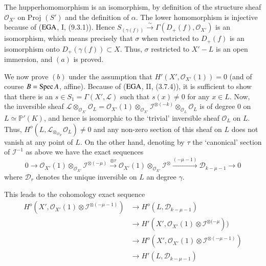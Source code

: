 The hupper\pageoriginale  homomorphism is an isomorphism, by
definition of the 
structure sheaf $\mathscr{O}_{X'}$ on Proj $(S')$ and the definition
of $\alpha$. The lower homomorphism is injective because of ($\operatorname{EGA}$,
I, (9.3.1)). Hence
$S_{(\gamma(f))}\overset{\sim}{\rightarrow}\Gamma(D_+(f),\mathscr{O}_{X'})$
is an isomorphism, which means precisely that $\sigma$ when restricted
to $D_+(f)$ is an isomorphism onto $D_+(\gamma(f))\subset X$. Thus,
$\sigma$ restricted to $X' - L$ is an open immersion, and $(a)$ is
proved. 

We now prove $(b)$ under the assumption that
$H'(X',\mathscr{O}_{X'}(1)) = 0$ (and of course $B = \operatorname{Spec} A$,
affine). Because of ($\operatorname{EGA}$, II, (3.7.4)), it is sufficient to show
that there is an $s \in S_1 = \Gamma(X',\mathscr{L})$ such that $s(x)
\neq 0 $ for any $x \in L$. Now, the inversible sheaf
$\mathscr{L}\otimes_{\mathscr{O}_{X'}}\mathscr{O}_L =
\mathscr{O}_{X'}(1)\otimes_{\mathscr{O}_{X'}}\mathscr{I}^{\otimes
  (-k)}\otimes_{\mathscr{O}_L}\mathscr{O}_L$ is of degree $0$ on $L
\simeq \mathbb{P}'(K)$, and hence is isomorphic to the `trivial'
inversible sheaf $\mathscr{O}_L$ on $L$. Thus,
$H^o(L,\mathscr{L}_{\otimes_{\mathscr{O}_{X'}}} \mathscr{O}_L )\neq 0$
and any non-zero section of this sheaf on $L$ does not vanish at any
point of $L$. On the other hand, denoting by $\tau$ the `canonical'
section of $\mathscr{I}^{-1}$ as above we have the exact sequences 
$$
0 \rightarrow \mathscr{O}_{X'}(1)
\otimes_{\mathscr{O}_{X'}}\mathscr{I}^{\otimes(-\mu)}\xrightarrow{\otimes\tau}
\mathscr{O}_{X'}(1)\otimes_{\mathscr{O}_{X'}}\mathscr{I}^{\otimes}\xrightarrow{(-\mu
  -1)} \mathscr{D}_{k-\mu -1} \rightarrow 0 
$$
where $\mathscr{D}_r$ denotes the unique inversible on $L$ an degree $\gamma$. 

This leads to the cohomology exact sequence
\begin{align*}
  H^o(X',\mathscr{O}_{X'}(1)\otimes  \mathscr{I}^{\otimes (-\mu -1)})
  & \rightarrow H^o(L,\mathscr{D}_{k-\mu -1})\\ 
  &\rightarrow
  H'(X',\mathscr{O}_{X'}(1)\otimes\mathscr{I}^{\otimes(-\mu}))\\ 
  &\rightarrow H^o(X',\mathscr{O}_{X'}(1)\otimes
  \mathscr{I}^{\otimes(-\mu -1)})\\
 &\rightarrow H'(L,\mathscr{D}_{k-\mu    -1}) 
\end{align*}

